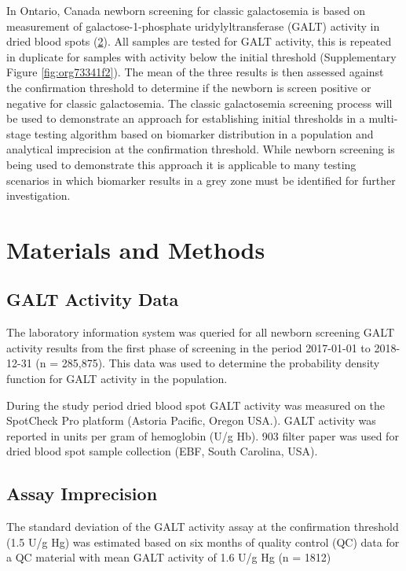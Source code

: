 \documentclass[review]{elsarticle}
\begin{document}
In Ontario, Canada newborn screening for classic galactosemia is based
on measurement of galactose-1-phosphate uridylyltransferase (GALT)
activity in dried blood spots (\hyperlink{citeproc_bib_item_2}{2}). All samples are
tested for GALT activity, this is repeated in duplicate for samples
with activity below the initial threshold (Supplementary Figure
\ref{fig:org73341f2}). The mean of the three results is then assessed against
the confirmation threshold to determine if the newborn is screen
positive or negative for classic galactosemia. The classic
galactosemia screening process will be used to demonstrate an approach
for establishing initial thresholds in a multi-stage testing algorithm
based on biomarker distribution in a population and analytical
imprecision at the confirmation threshold. While newborn screening is
being used to demonstrate this approach it is applicable to many
testing scenarios in which biomarker results in a grey zone must be
identified for further investigation.

\section*{Materials and Methods}
\label{sec:org693a3c0}
\subsection*{GALT Activity Data}
\label{sec:orgae59ed8}
The laboratory information system was queried for all newborn
screening GALT activity results from the first phase of screening in
the period 2017-01-01 to 2018-12-31 (n = 285,875). This data was used
to determine the probability density function for GALT activity in the
population.

During the study period dried blood spot GALT activity was measured
on the SpotCheck Pro platform (Astoria Pacific, Oregon USA.). GALT
activity was reported in units per gram of hemoglobin (U/g Hb). 903
filter paper was used for dried blood spot sample collection (EBF,
South Carolina, USA).

\subsection*{Assay Imprecision}
\label{sec:orgbbc5ab2}
The standard deviation of the GALT activity assay at the confirmation
threshold (1.5 U/g Hg) was estimated based on six months of quality
control (QC) data for a QC material with mean GALT activity of 1.6 U/g
Hg (n = 1812)
\end{document}
